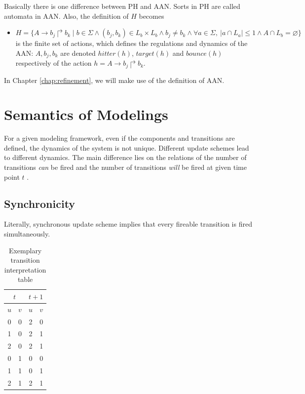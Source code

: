 Basically there is one difference between PH and AAN. 
Sorts in PH are called automata in AAN.
Also, the definition of $H$ becomes

\begin{itemize}
    \item $H=\{A\to b_j\Rsh b_k\mid b\in \Sigma \land (b_j,b_k)\in L_b\times L_b\land b_j\neq b_k\land \forall a \in \Sigma,\ |a\cap L_a|\leq 1 \land A\cap L_b=\varnothing\}$ is the finite set of actions, which defines the regulations and dynamics of the AAN: $A, b_j, b_k$ are denoted $hitter(h)$, $target(h)$ and $bounce(h)$ respectively of the action $h=A\to b_j\Rsh b_k$.
\end{itemize}
In Chapter \ref{chap:refinement}, we will make use of the definition of AAN.

\section{Semantics of Modelings}\label{sec:semantics}
For a given modeling framework, even if the components and transitions are defined, the dynamics of the system is not unique. 
Different update schemes lead to different dynamics.
The main difference lies on the relations of the number of transitions \textit{can} be fired and the number of transitions \textit{will} be fired at given time point $t$ \cite{ribeiro2018learning,chatain2018boolean}.



\subsection{Synchronicity}
Literally, synchronous update scheme implies that every fireable transition is fired simultaneously.

\begin{table}[ht]
    \centering
    \begin{tabular}{cc|cc}
        \multicolumn{2}{c|}{$t$}&\multicolumn{2}{c}{$t+1$}\\
        \hline
        $u$ & $v$ & $u$ & $v$ \\
        \hline
        0 & 0 & 2 & 0 \\
        1 & 0 & 2 & 1 \\
        2 & 0 & 2 & 1 \\
        0 & 1 & 0 & 0 \\
        1 & 1 & 0 & 1 \\
        2 & 1 & 2 & 1 \\
    \end{tabular}
    \caption{Exemplary transition interpretation table}
    \label{tab:transTable}
\end{table}


